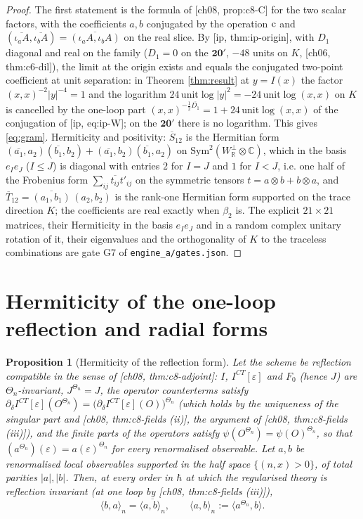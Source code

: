 \documentclass[11pt]{article}
\theoremstyle{plain}
\newtheorem{proposition}[theorem]{Proposition}
\theoremstyle{definition}
\numberwithin{equation}{section}
\newcommand{\Wp}{W_{\mathbb R}^\perp}
\newcommand{\TP}[2]{\big\langle #1,#2\big\rangle}
\begin{document}
\begin{proof}
The first statement is the formula of [ch08, prop:c8-C] for the two scalar factors, with the coefficients $a,b$ conjugated by the operation ${\rm c}$ and $(\overline{\iota_aA},\overline{\iota_bA})=\overline{(\iota_aA,\iota_bA)}$ on the real slice. By [ip, thm:ip-origin], with $D_1$ diagonal and real on the family ($D_1=0$ on the $\mathbf{20'}$, $-48$ units on $K$, [ch06, thm:c6-dil]), the limit at the origin exists and equals the conjugated two-point coefficient at unit separation: in Theorem \ref{thm:result} at $y=I(x)$ the factor $(x,x)^{-2}|y|^{-4}=1$ and the logarithm $24\,\mathrm{unit}\log|y|^2=-24\,\mathrm{unit}\log(x,x)$ on $K$ is cancelled by the one-loop part $(x,x)^{-\frac12\overline{D_1}}=1+24\,\mathrm{unit}\log(x,x)$ of the conjugation of [ip, eq:ip-W]; on the $\mathbf{20'}$ there is no logarithm. This gives \eqref{eq:gram}. Hermiticity and positivity: $\overline{S}_{12}$ is the Hermitian form $(\overline{a_1},a_2)(\overline{b_1},b_2)+(\overline{a_1},b_2)(\overline{b_1},a_2)$ on $\mathrm{Sym}^2(\Wp\otimes\mathbb C)$, which in the basis $e_Ie_J$ ($I\le J$) is diagonal with entries $2$ for $I=J$ and $1$ for $I<J$, i.e. one half of the Frobenius form $\sum_{ij}\overline{t_{ij}}t'_{ij}$ on the symmetric tensors $t=a\otimes b+b\otimes a$, and $\overline T_{12}=\overline{(a_1,b_1)}\,(a_2,b_2)$ is the rank-one Hermitian form supported on the trace direction $K$; the coefficients are real exactly when $\beta_2$ is. The explicit $21\times21$ matrices, their Hermiticity in the basis $e_Ie_J$ and in a random complex unitary rotation of it, their eigenvalues and the orthogonality of $K$ to the traceless combinations are gate G7 of \texttt{engine\_a/gates.json}.
\end{proof}

\section{Hermiticity of the one-loop reflection and radial forms}

\begin{proposition}[Hermiticity of the reflection form]
\label{prop:herm}
Let the scheme be reflection compatible in the sense of [ch08, thm:c8-adjoint]: $I$, $I^{CT}[\varepsilon]$ and $F_0$ (hence $J$) are $\Theta_n$-invariant, $J^{\Theta_n}=J$, the operator counterterms satisfy $\partial_\delta I^{CT}[\varepsilon](O^{\Theta_n})=\big(\partial_\delta I^{CT}[\varepsilon](O)\big)^{\Theta_n}$ (which holds by the uniqueness of the singular part and [ch08, thm:c8-fields (ii)], the argument of [ch08, thm:c8-fields (iii)]), and the finite parts of the operators satisfy $\psi(O^{\Theta_n})=\psi(O)^{\Theta_n}$, so that $(a^{\Theta_n})(\varepsilon)=a(\varepsilon)^{\Theta_n}$ for every renormalised observable. Let $a,b$ be renormalised local observables supported in the half space $\{(n,x)>0\}$, of total parities $|a|,|b|$. Then, at every order in $\hbar$ at which the regularised theory is reflection invariant (at one loop by [ch08, thm:c8-fields (iii)]),
\[
\langle b,a\rangle_n=\overline{\langle a,b\rangle_n},\qquad \langle a,b\rangle_n:=\TP{a^{\Theta_n}}{b}.
\]
\end{proposition}
\end{document}
